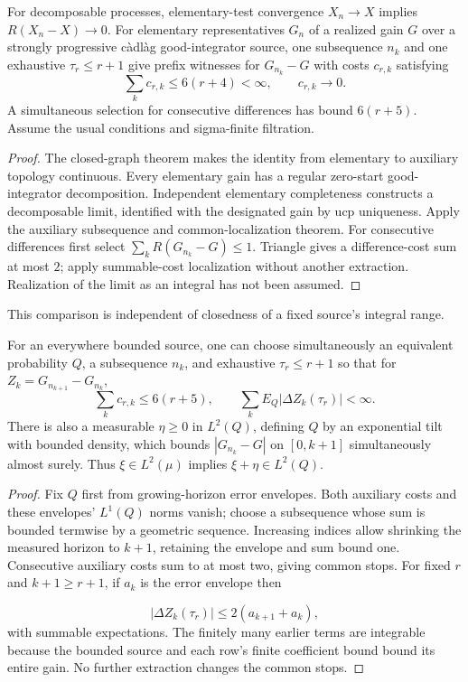 \begin{proposition}\label{prop:topology-localization}
For decomposable processes, elementary-test convergence $X_n\to X$ implies
$R(X_n-X)\to0$. For elementary representatives $G_n$ of a realized gain $G$
over a strongly progressive c\`adl\`ag good-integrator source, one subsequence
$n_k$ and one exhaustive $\tau_r\leq r+1$ give prefix witnesses for
$G_{n_k}-G$ with costs $c_{r,k}$ satisfying
\[
 \sum_kc_{r,k}\leq6(r+4)<\infty,\qquad c_{r,k}\longrightarrow0.
\]
A simultaneous selection for consecutive differences has bound $6(r+5)$.
Assume the usual conditions and sigma-finite filtration.
\end{proposition}
\begin{proof}
The closed-graph theorem makes the identity from elementary to auxiliary
topology continuous. Every elementary gain has a regular zero-start
good-integrator decomposition. Independent elementary completeness constructs
a decomposable limit, identified with the designated gain by ucp uniqueness.
Apply the auxiliary subsequence and common-localization theorem.
For consecutive differences first select
$\sum_kR(G_{n_k}-G)\leq1$. Triangle gives a difference-cost sum at most $2$;
apply summable-cost localization without another extraction.
Realization of the limit as an integral has not been assumed.
\end{proof}
This comparison is independent of closedness of a fixed source's integral range.
\begin{proposition}\label{prop:joint-costs}
For an everywhere bounded source, one can choose simultaneously an equivalent
probability $Q$, a subsequence $n_k$, and exhaustive $\tau_r\leq r+1$ so
that for $Z_k=G_{n_{k+1}}-G_{n_k}$,
\[
 \sum_kc_{r,k}\leq6(r+5),\qquad
 \sum_kE_Q|\Delta Z_k(\tau_r)|<\infty.
\]
There is also a measurable $\eta\geq0$ in $L^2(Q)$, defining $Q$ by an
exponential tilt with bounded density, which bounds $|G_{n_k}-G|$ on
$[0,k+1]$ simultaneously almost surely. Thus $\xi\in L^2(\mu)$ implies
$\xi+\eta\in L^2(Q)$.
\end{proposition}
\begin{proof}
Fix $Q$ first from growing-horizon error envelopes. Both auxiliary costs
and these envelopes' $L^1(Q)$ norms vanish; choose a subsequence whose sum
is bounded termwise by a geometric sequence. Increasing indices allow
shrinking the measured horizon to $k+1$, retaining the envelope and sum bound
one. Consecutive auxiliary costs sum to at most two, giving common stops.
For fixed $r$ and $k+1\geq r+1$, if $a_k$ is the error envelope then

\[
 |\Delta Z_k(\tau_r)|\leq2(a_{k+1}+a_k),
\] with summable expectations.
The finitely many earlier terms are integrable because the bounded source
and each row's finite coefficient bound bound its entire gain.
No further extraction changes the common stops.
\end{proof}

